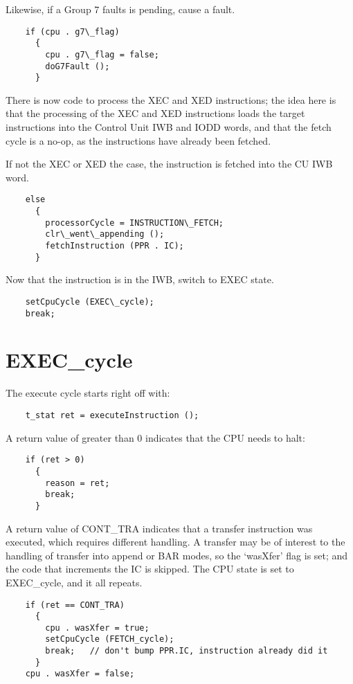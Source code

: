 \documentclass[notitlepage]{report}
\begin{document}
Likewise, if a Group 7 faults is pending, cause a fault.

\begin{verbatim}
    if (cpu . g7\_flag)
      {
        cpu . g7\_flag = false;
        doG7Fault ();
      }
\end{verbatim}

There is now code to process the XEC and XED instructions; the idea here is
that the processing of the XEC and XED instructions loads the target 
instructions into the Control Unit IWB and IODD words, and that the 
fetch cycle is a no-op, as the instructions have already been 
fetched.

If not the XEC or XED the case, the instruction is fetched into the
CU IWB word.

\begin{verbatim}
    else
      {
        processorCycle = INSTRUCTION\_FETCH;
        clr\_went\_appending ();
        fetchInstruction (PPR . IC);
      }
\end{verbatim}

Now that the instruction is in the IWB, switch to EXEC state.

\begin{verbatim}
    setCpuCycle (EXEC\_cycle);
    break;
\end{verbatim}

\section{EXEC\_cycle}

The execute cycle starts right off with:

\begin{verbatim}
    t_stat ret = executeInstruction ();
\end{verbatim}

A return value of greater than 0 indicates that the CPU needs to halt:

\begin{verbatim}
    if (ret > 0)
      {
        reason = ret;
        break;
      }
\end{verbatim}

A return value of CONT\_TRA indicates that a transfer instruction 
was executed, which requires different handling. A transfer 
may be of interest to the handling of
transfer into append or BAR modes, so the `wasXfer' flag is set; and
the code that increments the IC is skipped. The CPU state is set to
EXEC\_cycle, and it all repeats.

\begin{verbatim}
    if (ret == CONT_TRA)
      {
        cpu . wasXfer = true;
        setCpuCycle (FETCH_cycle);
        break;   // don't bump PPR.IC, instruction already did it
      }
    cpu . wasXfer = false;
\end{verbatim}
\end{document}
